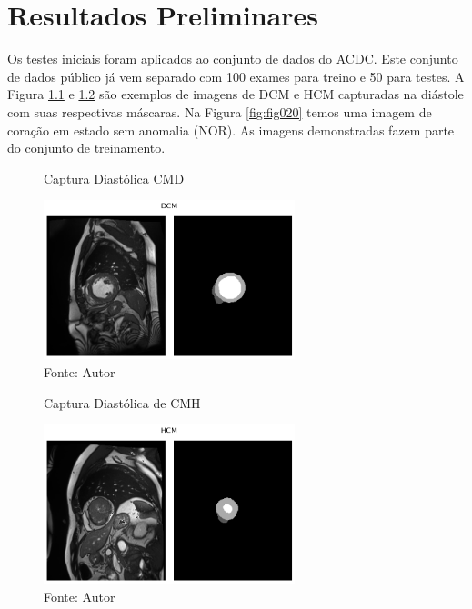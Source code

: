 \chapter{Resultados  Preliminares}
\label{chap:resultados_discussao}

Os testes iniciais foram aplicados ao conjunto de dados do \gls{ACDC}. Este conjunto de dados público já vem separado com 100 exames para treino e 50 para testes. A Figura \ref{fig:fig018} e \ref{fig:fig019} são exemplos de imagens de \gls{DCM} e \gls{HCM} capturadas na diástole com suas respectivas máscaras. Na Figura \ref{fig:fig020} temos uma imagem de coração em estado sem anomalia (\gls{NOR}). As imagens demonstradas fazem parte do conjunto de treinamento.

\begin{figure}[h!]
    \centering
    \caption{Captura Diastólica CMD}
    \includegraphics[width=0.65\textwidth]{figures/fig018.png}
    \caption*{Fonte: Autor}
    \label{fig:fig018}
\end{figure}

\begin{figure}[h!]
    \caption{Captura Diastólica de CMH}
    \centering
    \includegraphics[width=0.65\textwidth]{figures/fig019.png}
    \caption*{Fonte: Autor}
    \label{fig:fig019}
\end{figure}


